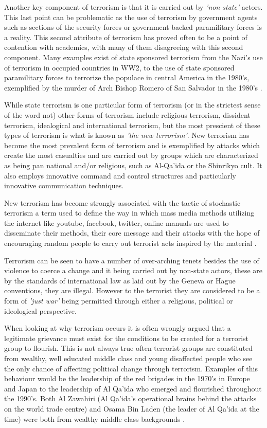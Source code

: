 Another key component of terrorism is that it is carried out by \textit{'non state'} actors. This last point can be problematic as the use of terrorism by government agents such as sections of the security forces or government backed paramilitary forces is a reality. This second attribute of terrorism has proved often to be a point of contention with academics, with many of them disagreeing with this second component. Many examples exist of state sponsored terrorism from the Nazi's use of terrorism in occupied countries in WW2, to the use of state sponsored paramilitary forces to terrorize the populace in central America in the  1980's, exemplified by the murder of Arch Bishop Romero of San Salvador in the 1980's \citep{romero1998violence}. 

While state terrorism is one particular form of terrorism (or in the strictest sense of the word not) other forms of terrorism include religious terrorism, dissident terrorism, idealogical and international terrorism, but the most prescient of these types of terrorism is what is known as \textit{'the new terrorism'}. New terrorism has become the most prevalent form of terrorism and is exemplified by attacks which create the most casualties and are carried out by groups which are characterized as being pan national and/or religious, such as Al-Qa'ida or the Shinrikyo cult. It also employs innovative command and control structures and particularly innovative communication techniques. 

New terrorism has become strongly associated with the tactic of stochastic terrorism a term used to define the way in which mass media methods utilizing the internet like youtube, facebook, twitter, online manuals are used to disseminate their methods, their core message and their attacks with the hope of encouraging random people to carry out terrorist acts inspired by the material \citep{margulies2016trump}. 

Terrorism can be seen to have a number of over-arching tenets besides the use of violence to coerce a change and it being carried out by non-state actors, these are by the standards of international law as laid out by the Geneva or Hague conventions, they are illegal. However to the terrorist they are considered to be a form of \textit{'just war'} being permitted through either a religious, political or ideological perspective.

When looking at why terrorism occurs it is often wrongly argued that a legitimate grievance must exist for the conditions to be created for a terrorist group to flourish. This is not always true often terrorist groups are constituted from wealthy, well educated middle class and young disaffected people who see the only chance of affecting political change through terrorism. Examples of this behaviour would be the leadership of the red brigades in the 1970's in Europe and Japan to the leadership of Al Qa'ida who emerged and flourished throughout the 1990's. Both Al Zawahiri (Al Qa'ida's operational brains behind the attacks on the world trade centre) and Osama Bin Laden (the leader of Al Qa'ida at the time) were both from wealthy middle class backgrounds \citep{henzel2005origins}.

